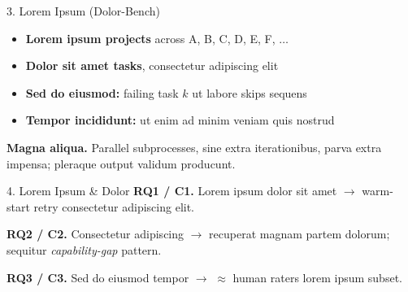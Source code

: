
\begin{block}{3. Lorem Ipsum (Dolor-Bench)}
\begin{itemize}
    \item \textbf{Lorem ipsum projects} across A, B, C, D, E, F, $\ldots$
    \item \textbf{Dolor sit amet tasks}, consectetur adipiscing elit
    \item \textbf{Sed do eiusmod:} failing task $k$ ut labore skips sequens
    \item \textbf{Tempor incididunt:} ut enim ad minim veniam quis nostrud
\end{itemize}

\vspace{0.3em}
\textbf{Magna aliqua.} Parallel subprocesses, sine extra iterationibus, parva extra impensa; pleraque output validum producunt.
\end{block}

\begin{contribblock}{4. Lorem Ipsum \& Dolor}
\textbf{RQ1 / C1.} Lorem ipsum dolor sit amet $\to$ warm-start retry consectetur adipiscing elit.

\vspace{0.2em}
\textbf{RQ2 / C2.} Consectetur adipiscing $\to$ \system{} recuperat magnam partem dolorum; sequitur \emph{capability-gap} pattern.

\vspace{0.2em}
\textbf{RQ3 / C3.} Sed do eiusmod tempor $\to$ \system{} $\approx$ human raters lorem ipsum subset.
\end{contribblock}
